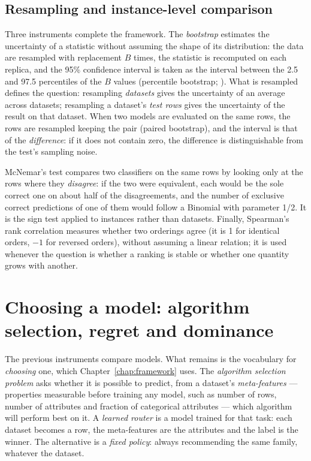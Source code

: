 \subsection{Resampling and instance-level comparison}
\label{sec:fund-reamostragem}

Three instruments complete the framework. The \emph{bootstrap}
estimates the uncertainty of a statistic without assuming the shape
of its distribution: the data are resampled with replacement $B$
times, the statistic is recomputed on each replica, and the 95\%
confidence interval is taken as the interval between the 2.5 and
97.5 percentiles of the $B$ values (percentile bootstrap;
\citealp{efron1993}). What is resampled defines the question:
resampling \emph{datasets} gives the uncertainty of an average
across datasets; resampling a dataset's \emph{test rows} gives the
uncertainty of the result on that dataset. When two models are
evaluated on the same rows, the rows are resampled keeping the pair
(paired bootstrap), and the interval is that of the
\emph{difference}: if it does not contain zero, the difference is
distinguishable from the test's sampling noise.

McNemar's test \citep{mcnemar1947} compares two classifiers on the
same rows by looking only at the rows where they \emph{disagree}:
if the two were equivalent, each would be the sole correct one on
about half of the disagreements, and the number of exclusive
correct predictions of one of them would follow a Binomial with
parameter 1/2. It is the sign test applied to instances rather
than datasets. Finally, Spearman's rank correlation measures
whether two orderings agree (it is 1 for identical orders, $-1$
for reversed orders), without assuming a linear relation; it is
used whenever the question is whether a ranking is stable or
whether one quantity grows with another.

\section{Choosing a model: algorithm selection, regret and dominance}
\label{sec:fund-selecao}

The previous instruments compare models. What remains is the
vocabulary for \emph{choosing} one, which
Chapter~\ref{chap:framework} uses. The \emph{algorithm selection
problem} \citep{rice1976} asks whether it is possible to predict,
from a dataset's \emph{meta-features} --- properties measurable
before training any model, such as number of rows, number of
attributes and fraction of categorical attributes --- which
algorithm will perform best on it. A \emph{learned router} is a
model trained for that task: each dataset becomes a row, the
meta-features are the attributes and the label is the winner. The
alternative is a \emph{fixed policy}: always recommending the same
family, whatever the dataset.

